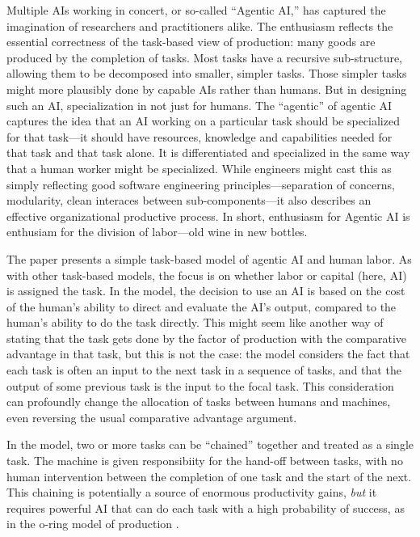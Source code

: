 \documentclass{article}
\begin{document}
Multiple AIs working in concert, or so-called ``Agentic AI,'' has captured the imagination of researchers and practitioners alike.
The enthusiasm reflects the essential correctness of the task-based view of production: many goods are produced by the completion of tasks.
Most tasks have a recursive sub-structure, allowing them to be decomposed into smaller, simpler tasks.
Those simpler tasks might more plausibly done by capable AIs rather than humans. 
But in designing such an AI, specialization in not just for humans.
The ``agentic'' of agentic AI captures the idea that an AI working on a particular task should be specialized for that task---it should have resources, knowledge and capabilities needed for that task and that task alone.
It is differentiated and specialized in the same way that a human worker might be specialized. 
While engineers might cast this as simply reflecting good software engineering principles---separation of concerns, modularity, clean interaces between sub-components---it also describes an effective organizational productive process.
In short, enthusiasm for Agentic AI is enthusiam for the division of labor---old wine in new bottles. 

The paper presents a simple task-based model of agentic AI and human labor.
As with other task-based models, the focus is on whether labor or capital (here, AI) is assigned the task.
In the model, the decision to use an AI is based on the cost of the human's ability to direct and evaluate the AI's output, compared to the human's ability to do the task directly.
This might seem like another way of stating that the task gets done by the factor of production with the comparative advantage in that task, but this is not the case:
the model considers the fact that each task is often an input to the next task in a sequence of tasks, and that the output of some previous task is the input to the focal task.
This consideration can profoundly change the allocation of tasks between humans and machines, even reversing the usual comparative advantage argument.

In the model, two or more tasks can be ``chained'' together and treated as a single task.
The machine is given responsibiity for the hand-off between tasks, with no human intervention between the completion of one task and the start of the next.
This chaining is potentially a source of enormous productivity gains, \emph{but} it requires powerful AI that can do each task with a high probability of success, as in the o-ring model of production \citep{kremer1993}.
\end{document}
